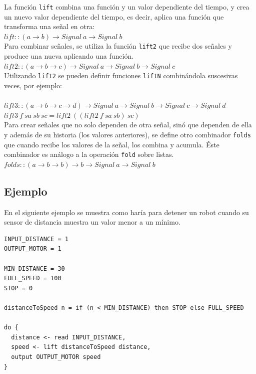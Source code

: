   La función \texttt{lift} combina una función y un valor
dependiente del tiempo, y crea un nuevo valor dependiente
del tiempo, es decir, aplica una función que transforma
una señal en otra:\\

$lift :: (a \rightarrow b) \rightarrow Signal\ a \rightarrow Signal\ b$\\

  Para combinar señales, se utiliza la función \texttt{lift2}
que recibe dos señales y produce una nueva aplicando una
función.\\

$lift2 :: (a \rightarrow b \rightarrow c) \rightarrow Signal\ a \rightarrow Signal\ b \rightarrow Signal\ c$\\

Utilizando \texttt{lift2} se pueden definir funciones \texttt{liftN}
combinándola suscesivas veces, por ejemplo:\\
\\
$lift3 :: (a \rightarrow b \rightarrow c \rightarrow d) \rightarrow Signal\ a \rightarrow Signal\ b \rightarrow Signal\ c \rightarrow Signal\ d$\\
$lift3\ f\ sa\ sb\ sc = lift2\ ((lift2\ f\ sa\ sb)\ sc)$\\

Para crear señales que no solo dependen de otra señal, sinó que dependen
de ella y además de su historia (los valores anteriores),
se define otro combinador \texttt{folds}
que cuando recibe los valores de la señal, los combina y acumula. Éste
combinador es análogo a la operación \texttt{fold} sobre listas.\\

$folds :: (a \rightarrow b \rightarrow b) \rightarrow b \rightarrow Signal\ a \rightarrow Signal\ b$\\

\subsection{Ejemplo}

  En el siguiente ejemplo se muestra como haría para detener un
robot cuando su sensor de distancia muestra un valor menor a un mínimo.

\begin{verbatim}
INPUT_DISTANCE = 1
OUTPUT_MOTOR = 1

MIN_DISTANCE = 30
FULL_SPEED = 100
STOP = 0

distanceToSpeed n = if (n < MIN_DISTANCE) then STOP else FULL_SPEED

do {
  distance <- read INPUT_DISTANCE,
  speed <- lift distanceToSpeed distance,
  output OUTPUT_MOTOR speed
}

\end{verbatim}

